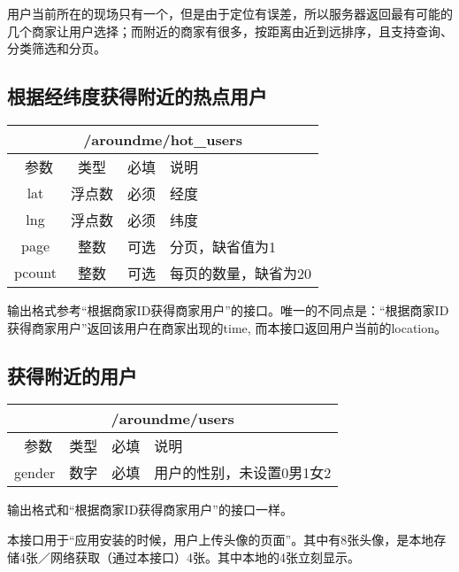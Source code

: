 \documentclass[cs4size]{ctexartutf8}
\begin{document}
用户当前所在的现场只有一个，但是由于定位有误差，所以服务器返回最有可能的几个商家让用户选择；而附近的商家有很多，按距离由近到远排序，且支持查询、分类筛选和分页。


\subsection{根据经纬度获得附近的热点用户}

\begin{table}[H]
   \begin{center}
\begin{tabular}{|c|c|c|p{12cm}|}
\hline
\multicolumn{4}{|c|}{/aroundme/hot\_users} \\
\hline\hline
 \  参数  & 类型 & 必填 &  说明  \\
\hline
 lat  & 浮点数 & 必须 & 经度\\
\hline
 lng  &  浮点数 & 必须 & 纬度\\ 
  \hline
 page  & 整数 & 可选 & 分页，缺省值为1\\ 
 \hline
 pcount  & 整数 & 可选 & 每页的数量，缺省为20\\ 
\hline
\end{tabular}
   \end{center}
\end{table}

输出格式参考“根据商家ID获得商家用户”的接口。唯一的不同点是：“根据商家ID获得商家用户”返回该用户在商家出现的time, 而本接口返回用户当前的location。




\subsection{获得附近的用户}

\begin{table}[H]
   \begin{center}
\begin{tabular}{|c|c|c|p{12cm}|}
\hline
\multicolumn{4}{|c|}{/aroundme/users} \\
\hline\hline
 \  参数  & 类型 & 必填 &  说明  \\
 \hline
 gender  & 数字 & 必填 &  用户的性别，未设置0男1女2\\
\hline
\end{tabular}
   \end{center}
\end{table}

输出格式和“根据商家ID获得商家用户”的接口一样。

本接口用于“应用安装的时候，用户上传头像的页面”。其中有8张头像，是本地存储4张／网络获取（通过本接口）4张。其中本地的4张立刻显示。
\end{document}
